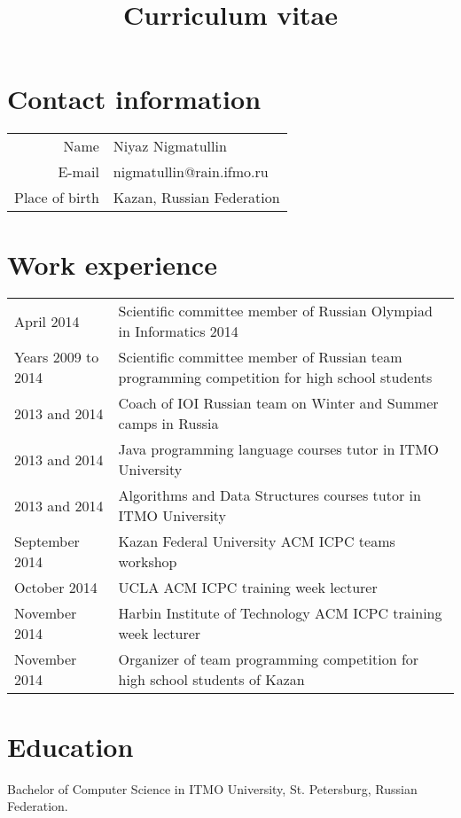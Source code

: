 \documentclass[11pt,a4paper,oneside]{article}
\begin{document}
\title{Curriculum vitae}
\date{}        
\maketitle

\section{Contact information}
\begin{center}
\begin{tabular}{r|l}
    Name&Niyaz Nigmatullin \\
    E-mail&nigmatullin@rain.ifmo.ru \\
    Place of birth&Kazan, Russian Federation \\
\end{tabular}
\end{center}

\section{Work experience}
\begin{center}
  \begin{tabular}{l|p{12 cm}}
    April 2014 & Scientific committee member of Russian Olympiad in Informatics 2014 \\
    Years 2009 to 2014 & Scientific committee member of Russian team programming competition for high school students \\
    2013 and 2014 & Coach of IOI Russian team on Winter and Summer camps in Russia \\
    2013 and 2014 & Java programming language courses tutor in ITMO University \\
    2013 and 2014 & Algorithms and Data Structures courses tutor in ITMO University \\
    September 2014 & Kazan Federal University ACM ICPC teams workshop \\
    October 2014 & UCLA ACM ICPC training week lecturer \\
    November 2014 & Harbin Institute of Technology ACM ICPC training week lecturer \\
    November 2014 & Organizer of team programming competition for high school students of Kazan \\
  \end{tabular}
\end{center}

\section{Education}
    Bachelor of Computer Science in ITMO University, St. Petersburg, Russian Federation.
\end{document}
